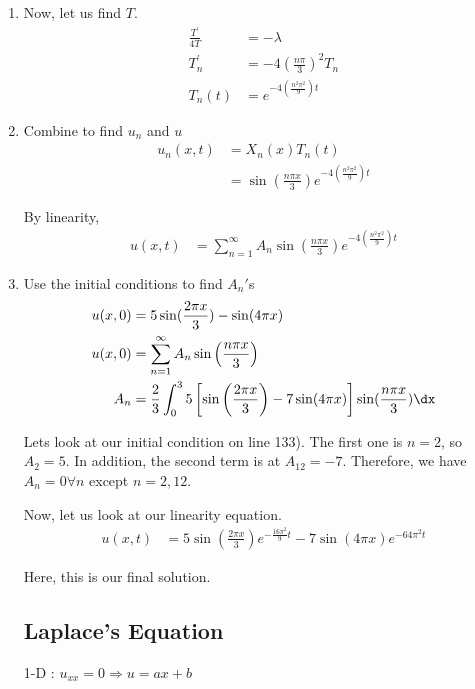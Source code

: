 \begin{enumerate}
  \item Now, let us find $T$.
  \begin{align}
    \frac{T^\prime}{4T} & = -\lambda\\
    T^\prime_n & = -4 \left( \frac{n \pi}{3} \right)^2 T_n\\
    T_n(t) & = e^{-4 \left( \frac{n^2 \pi^2}{9} \right)t}
  \end{align}
  \item Combine to find $u_n$ and $u$
  \begin{align}
    u_n(x, t) & = X_n(x)T_n(t)\\
    & = \sin\left( \frac{n \pi x}{3} \right) e^{-4 \left( \frac{n^2 \pi^2}{9} \right)t}
  \end{align}

  By linearity,
  \begin{align}
    u(x, t) & = \sum^\infty_{n = 1} A_n \sin\left( \frac{n \pi x}{3} \right) e^{-4 \left( \frac{n^2 \pi^2}{9} \right)t}
  \end{align}

  \item Use the initial conditions to find $A_n'$s
  \begin{align}
    u(x, 0) & = 5\sin(\frac{2 \pi x}{3}) - \sin(4 \pi x)\\
    u(x, 0) & = \sum^\infty_{n = 1} A_n \sin\left( \frac{n \pi x}{3} \right)\\
    A_n & = \frac{2}{3} \int^3_0 5 \left[\sin\left( \frac{2 \pi x}{3} \right)
    - 7 \sin(4 \pi x) \right] \sin(\frac{n \pi x}{3}) \dx
  \end{align}

  Lets look at our initial condition on line 133).
  The first one is $n =2$, so $A_2 = 5$.
  In addition, the second term is at $A_12 = -7$.
  Therefore, we have $A_n = 0 \forall n$ except $n = 2, 12$.

  Now, let us look at our linearity equation.
  \begin{align}
    u(x, t)
    & = 5 \sin\left( \frac{2 \pi x}{3} \right)
    e^{-\frac{16 \pi^2}{9} t} - 7 \sin\left( 4 \pi x \right) e^{-64 \pi^2 t}
  \end{align}

  Here, this is our final solution.

  \subsection{Laplace's Equation}

  1-D : $u_{xx} = 0 \Rightarrow u = ax + b$


\end{enumerate}
